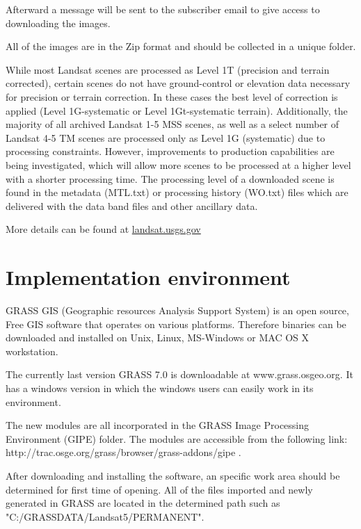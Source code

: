 Afterward a message will be sent to the subscriber email to give access to downloading the images.\newline

All of the images are in the Zip format and should be collected in a unique folder.\newline

While most Landsat scenes are processed as Level 1T (precision and terrain corrected), certain scenes do not have ground-control or elevation data necessary for precision or terrain correction. In these cases the best level of correction is applied (Level 1G-systematic or Level 1Gt-systematic terrain). Additionally, the majority of all archived Landsat 1-5 MSS scenes, as well as a select number of Landsat 4-5 TM scenes are processed only as Level 1G (systematic) due to processing constraints. However, improvements to production capabilities are being investigated, which will allow more scenes to be processed at a higher level with a shorter processing time. The processing level of a downloaded scene is found in the metadata (MTL.txt) or processing history (WO.txt) files which are delivered with the data band files and other ancillary data.\newline

More details can be found at \href{http://landsat.usgs.gov/products\_productinformation.php}{landsat.usgs.gov} \newline


\section{Implementation environment}
GRASS GIS (Geographic resources Analysis Support System) is an open source, Free GIS software that operates on various platforms. Therefore binaries can be downloaded and installed on Unix, Linux, MS-Windows or MAC OS X workstation.\newline

The currently last version GRASS 7.0 is downloadable at www.grass.osgeo.org. It has a windows version in which the windows users can easily work in its environment.\newline

The new modules are all incorporated in the GRASS Image Processing Environment (GIPE) folder. The modules are accessible from the following link: http://trac.osge.org/grass/browser/grass-addons/gipe .\newline

After downloading and installing the software, an specific work area should be determined for first time of opening. All of the files imported and newly generated in GRASS are located in the determined path such as "C:/GRASSDATA/Landsat5/PERMANENT". \newline

